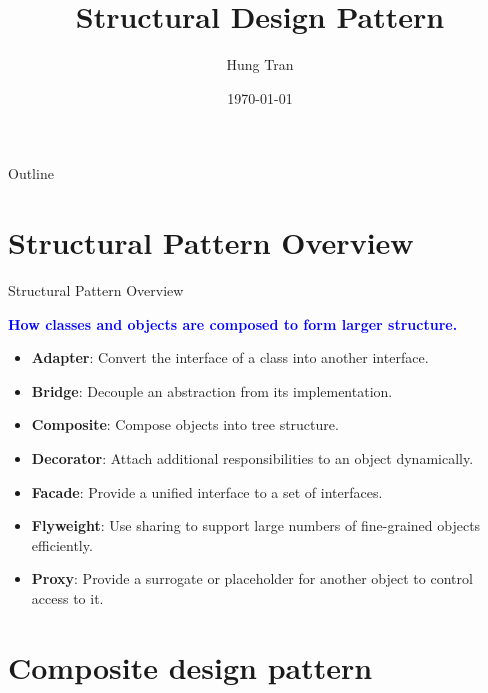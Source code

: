 \documentclass[13pt]{beamer}
\title[Design Pattern]{Structural Design Pattern}
\author{Hung Tran}
\institute{Fpt software}
\date{\today}
\begin{document}
\begin{frame}
	\titlepage
\end{frame}

\begin{frame}{Outline}
	\tableofcontents
\end{frame}

\section{Structural Pattern Overview}

\begin{frame}{Structural Pattern Overview}
	\begin{center}
		\textcolor{blue}{\textbf{How classes and objects are composed to form larger structure.}}
	\end{center}
	\begin{itemize}
		\item \textbf{Adapter}: Convert the interface of a class into another interface.
		\item \textbf{Bridge}: Decouple an abstraction from its implementation.
		\item \textbf{Composite}: Compose objects into tree structure.
		\item \textbf{Decorator}: Attach additional responsibilities to an object dynamically.
		\item \textbf{Facade}: Provide a unified interface to a set of interfaces.
		\item \textbf{Flyweight}: Use sharing to support large numbers of fine-grained objects efficiently.
		\item \textbf{Proxy}: Provide a surrogate or placeholder for another object to control access to it.
	\end{itemize}
\end{frame}

\section{Composite design pattern}
\end{document}
